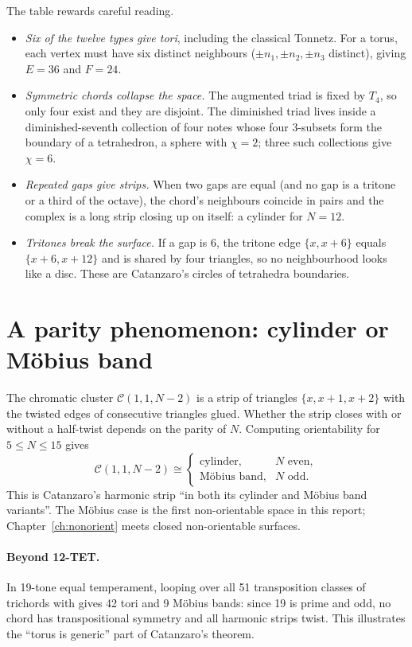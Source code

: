 The table rewards careful reading.
\begin{itemize}
\item \emph{Six of the twelve types give tori}, including the classical Tonnetz. For a torus, each vertex must have
six distinct neighbours ($\pm n_1,\pm n_2,\pm n_3$ distinct), giving $E=36$ and $F=24$.
\item \emph{Symmetric chords collapse the space.} The augmented triad is fixed by $T_4$, so only four exist and
they are disjoint. The diminished triad lives inside a diminished-seventh collection of four notes whose four
3-subsets form the boundary of a tetrahedron, a sphere with $\chi=2$; three such collections give $\chi=6$.
\item \emph{Repeated gaps give strips.} When two gaps are equal (and no gap is a tritone or a third of the octave), the chord's neighbours coincide in pairs and the
complex is a long strip closing up on itself: a cylinder for $N=12$.
\item \emph{Tritones break the surface.} If a gap is 6, the tritone edge $\{x,x+6\}$ equals $\{x+6,x+12\}$ and is
shared by four triangles, so no neighbourhood looks like a disc. These are Catanzaro's circles of tetrahedra
boundaries.
\end{itemize}

\section{A parity phenomenon: cylinder or M\"obius band}
The chromatic cluster $\mathcal C(1,1,N-2)$ is a strip of triangles $\{x,x+1,x+2\}$ with the twisted edges of
consecutive triangles glued. Whether the strip closes with or without a half-twist depends on the parity of $N$.
Computing orientability for $5\le N\le15$ gives
\[
\mathcal C(1,1,N-2)\cong\begin{cases}\text{cylinder}, & N\text{ even},\\ \text{M\"obius band}, & N\text{ odd}.\end{cases}
\]
This is Catanzaro's harmonic strip ``in both its cylinder and M\"obius band variants''. The M\"obius case is the
first non-orientable space in this report; Chapter~\ref{ch:nonorient} meets closed non-orientable surfaces.

\paragraph{Beyond 12-TET.} In 19-tone equal temperament, looping over all 51 transposition classes of trichords
with  gives 42 tori and 9 M\"obius bands: since 19 is prime and odd, no chord
has transpositional symmetry and all harmonic strips twist. This illustrates the ``torus is generic'' part of
Catanzaro's theorem.

